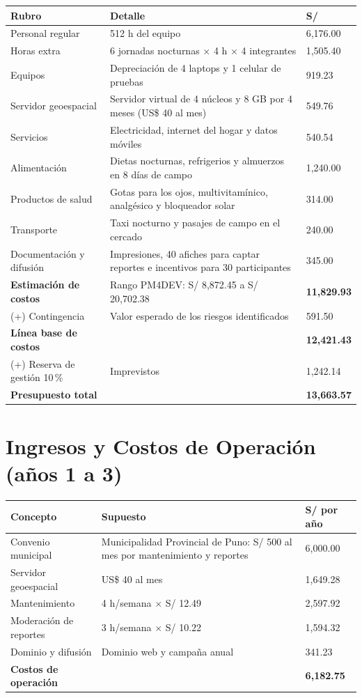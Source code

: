 \documentclass[11pt,a4paper]{article}
\begin{document}
\vspace{0.1cm}
{\small
\noindent\begin{tabularx}{\textwidth}{@{}P{3.6cm} L Q{2.0cm}@{}}
\toprule
{}
\textbf{Rubro} & \textbf{Detalle} & \textbf{S/} \\
\midrule
Personal regular & 512 h del equipo & 6,176.00 \\
Horas extra & 6 jornadas nocturnas $\times$ 4 h $\times$ 4 integrantes & 1,505.40 \\
Equipos & Depreciación de 4 laptops y 1 celular de pruebas & 919.23 \\
Servidor geoespacial & Servidor virtual de 4 núcleos y 8 GB por 4 meses (US\$ 40 al mes) & 549.76 \\
Servicios & Electricidad, internet del hogar y datos móviles & 540.54 \\
Alimentación & Dietas nocturnas, refrigerios y almuerzos en 8 días de campo & 1,240.00 \\
Productos de salud & Gotas para los ojos, multivitamínico, analgésico y bloqueador solar & 314.00 \\
Transporte & Taxi nocturno y pasajes de campo en el cercado & 240.00 \\
Documentación y difusión & Impresiones, 40 afiches para captar reportes e incentivos para 30 participantes & 345.00 \\
\midrule
\textbf{Estimación de costos} & Rango PM4DEV: S/ 8,872.45 a S/ 20,702.38 & \textbf{11,829.93} \\
(+) Contingencia & Valor esperado de los riesgos identificados & 591.50 \\
\textbf{Línea base de costos} & & \textbf{12,421.43} \\
(+) Reserva de gestión 10\,\% & Imprevistos & 1,242.14 \\
\textbf{Presupuesto total} & & \textbf{13,663.57} \\
\bottomrule
\end{tabularx}
}

\section{Ingresos y Costos de Operación (años 1 a 3)}
{\small
\noindent\begin{tabularx}{\textwidth}{@{}P{3.4cm} L Q{1.9cm}@{}}
\toprule
{}
\textbf{Concepto} & \textbf{Supuesto} & \textbf{S/ por año} \\
\midrule
Convenio municipal & Municipalidad Provincial de Puno: S/ 500 al mes por mantenimiento y reportes & 6,000.00 \\
\midrule
Servidor geoespacial & US\$ 40 al mes & 1,649.28 \\
Mantenimiento & 4 h/semana $\times$ S/ 12.49 & 2,597.92 \\
Moderación de reportes & 3 h/semana $\times$ S/ 10.22 & 1,594.32 \\
Dominio y difusión & Dominio web y campaña anual & 341.23 \\
\textbf{Costos de operación} & & \textbf{6,182.75} \\
\bottomrule
\end{tabularx}
}
\end{document}
